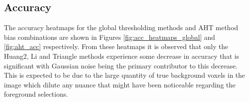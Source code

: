 \subsection{Accuracy}
The accuracy heatmaps for the global thresholding methods and AHT method bias combinations are shown in Figures \ref{fig:acc_heatmaps_global} and \ref{fig:aht_acc} respectively. From these heatmaps it is observed that only the Huang2, Li and Triangle methods experience some decrease in accuracy that is significant with Gaussian noise being the primary contributor to this decrease. This is expected to be due to the large quantity of true background voxels in the image which dilute any nuance that might have been noticeable regarding the foreground selections.
\begin{figure}
	\centering

\end{figure}
